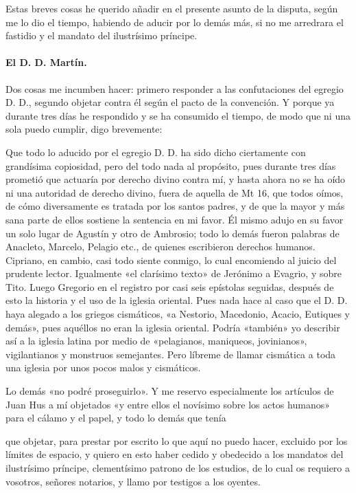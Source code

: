 Estas breves cosas he querido añadir en el presente asunto de la disputa, según me lo dio el tiempo, habiendo de aducir por lo demás más, si no me arredrara el fastidio y el mandato del ilustrísimo príncipe.

\paragraph*{El D. D. Martín.}

Dos cosas me incumben hacer: primero responder a las confutaciones del egregio D. D., segundo objetar contra él según el pacto de la convención. Y porque ya durante tres días he respondido y se ha consumido el tiempo, de modo que ni una sola puedo cumplir, digo brevemente:

Que todo lo aducido por el egregio D. D. ha sido dicho ciertamente con grandísima copiosidad, pero del todo nada al propósito, pues durante tres días prometió que actuaría por derecho divino contra mí, y hasta ahora no se ha oído ni una autoridad de derecho divino, fuera de aquella de Mt 16, que todos oímos, de cómo diversamente es tratada por los santos padres, y de que la mayor y más sana parte de ellos sostiene la sentencia en mi favor. Él mismo adujo en su favor un solo lugar de Agustín y otro de Ambrosio; todo lo demás fueron palabras de Anacleto, Marcelo, Pelagio etc., de quienes escribieron derechos humanos. Cipriano, en cambio, casi todo siente conmigo, lo cual encomiendo al juicio del prudente lector. Igualmente «el clarísimo texto» de Jerónimo a Evagrio, y sobre Tito. Luego Gregorio en el registro por casi seis epístolas seguidas, después de esto la historia y el uso de la iglesia oriental. Pues nada hace al caso que el D. D. haya alegado a los griegos cismáticos, «a Nestorio, Macedonio, Acacio, Eutiques y demás», pues aquéllos no eran la iglesia oriental. Podría «también» yo describir así a la iglesia latina por medio de «pelagianos, maniqueos, jovinianos», vigilantianos y monstruos semejantes. Pero líbreme de llamar cismática a toda una iglesia por unos pocos malos y cismáticos.

Lo demás «no podré proseguirlo». Y me reservo especialmente los artículos de Juan Hus a mí objetados «y entre ellos el novísimo sobre los actos humanos» para el cálamo y el papel, y todo lo demás que tenía

que objetar, para prestar por escrito lo que aquí no puedo hacer, excluido por los límites de espacio, y quiero en esto haber cedido y obedecido a los mandatos del ilustrísimo príncipe, clementísimo patrono de los estudios, de lo cual os requiero a vosotros, señores notarios, y llamo por testigos a los oyentes.

